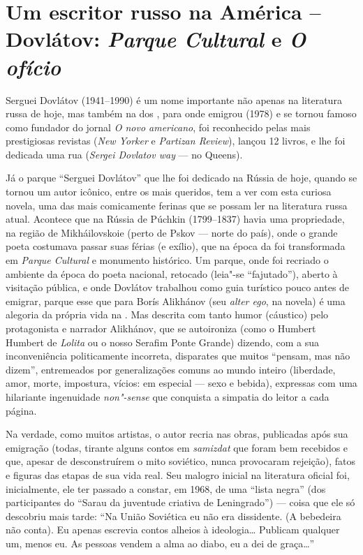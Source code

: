 \chapter*{Um escritor russo na América -- Dovlátov: \emph{Parque Cultural} e \emph{O ofício}}


Serguei Dovlátov (1941--1990) é um nome importante não apenas na
literatura russa de hoje, mas também na dos , para onde emigrou (1978) e se tornou famoso como fundador do jornal \emph{O novo
americano}, foi reconhecido pelas mais prestigiosas revistas (\emph{New
Yorker} e \emph{Partizan Review}), lançou 12 livros, e lhe foi dedicada
uma rua (\emph{Sergei Dovlatov way} --- no Queens).

Já o parque ``Serguei Dovlátov'' que lhe foi dedicado na Rússia de
hoje, quando se tornou um autor icônico, entre os mais queridos, tem a
ver com esta curiosa novela, uma das mais comicamente ferinas que se
possam ler na literatura russa atual. Acontece que na Rússia de Púchkin
(1799--1837) havia uma propriedade, na região de Mikháilovskoie (perto de
Pskov --- norte do país), onde o grande poeta costumava passar suas
férias (e exílio), que na época da  foi transformada em
\emph{Parque Cultural} e monumento histórico. Um parque, onde foi
recriado o ambiente da época do poeta nacional, retocado (leia"-se
``fajutado''), aberto à visitação pública, e onde Dovlátov trabalhou
como guia turístico pouco antes de emigrar, parque esse que para Borís
Alikhánov (seu \emph{alter ego}, na novela) é uma alegoria da própria
vida na . Mas descrita com tanto humor (cáustico) pelo protagonista
e narrador Alikhánov, que se autoironiza (como o Humbert Humbert de
\emph{Lolita} ou o nosso Serafim Ponte Grande) dizendo, com a sua
inconveniência politicamente incorreta, disparates que muitos ``pensam,
mas não dizem'', entremeados por generalizações comuns ao mundo inteiro
(liberdade, amor, morte, impostura, vícios: em especial --- sexo e
bebida), expressas com uma hilariante ingenuidade \emph{non"-sense} que
conquista a simpatia do leitor a cada página.

Na verdade, como muitos artistas, o autor recria nas obras, publicadas
após sua emigração (todas, tirante alguns contos em \emph{samizdat} que
foram bem recebidos e que, apesar de desconstruírem o mito soviético,
nunca provocaram rejeição), fatos e figuras das etapas de sua vida
real. Seu malogro inicial na literatura oficial foi, inicialmente, ele
ter passado a constar, em 1968, de uma ``lista negra'' (dos
participantes do ``Sarau da juventude criativa de Leningrado'') --- coisa
que ele só descobriu mais tarde: ``Na União Soviética eu não era
dissidente. (A bebedeira não conta). Eu apenas escrevia contos alheios à
ideologia\ldots{} Publicam qualquer um, menos eu. As pessoas vendem a alma ao
diabo, eu a dei de graça\ldots{}''

